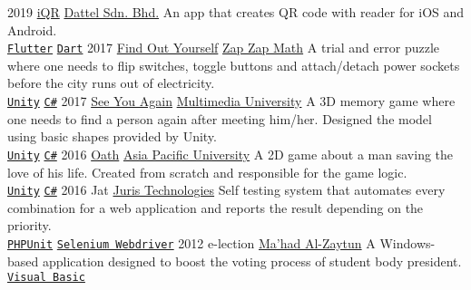 \documentclass[9pt]{developercv} %
\begin{document}

\begin{entrylist}
	\entry
		{2019}
		{\href{https://github.com/azfaralsukor/iQR}{iQR}}
		{\href{https://www.dattel.asia/}{Dattel Sdn. Bhd.}}
		{An app that creates QR code with reader for iOS and Android.\\ 
			\texttt{\href{https://flutter.dev/}{Flutter}}
				\slashsep
			\texttt{\href{https://www.dartlang.org/}{Dart}}
		}
	\entry
		{2017}
		{\href{https://azfaralsukor.github.io/Ludum-Dare-39/}{Find Out Yourself}}
		{\href{https://www.zapzapmath.com/}{Zap Zap Math}}
		{A trial and error puzzle where one needs to flip switches, toggle buttons and attach/detach power sockets before the city runs out of electricity.\\
			\texttt{\href{https://unity3d.com/}{Unity}}
				\slashsep
			\texttt{\href{https://docs.microsoft.com/en-us/dotnet/csharp/}{C\#}}
		}
	\entry
		{2017}
		{\href{https://ldjam.com/events/ludum-dare/38/see-you-again}{See You Again}}
		{\href{https://www.mmu.edu.my/}{Multimedia University}}
		{A 3D memory game where one needs to find a person again after meeting him/her. Designed the model using basic shapes provided by Unity. \\ 
			\texttt{\href{https://unity3d.com/}{Unity}}
				\slashsep
			\texttt{\href{https://docs.microsoft.com/en-us/dotnet/csharp/}{C\#}}
		}
	\entry
		{2016}
		{\href{https://github.com/azfaralsukor/Ludum-Dare-37}{Oath}}
		{\href{http://www.apu.edu.my/}{Asia Pacific University}}
		{A 2D game about a man saving the love of his life. Created from scratch and responsible for the game logic.\\ 
			\texttt{\href{https://unity3d.com/}{Unity}}
				\slashsep
			\texttt{\href{https://docs.microsoft.com/en-us/dotnet/csharp/}{C\#}}
		}
	\entry
		{2016}
		{Jat}
		{\href{http://juristech.net/juristech/}{Juris Technologies}}
		{Self testing system that automates every combination for a web application and reports the result depending on the priority.\\ 
			\texttt{\href{https://phpunit.de/}{PHPUnit}}
				\slashsep
			\texttt{\href{https://www.seleniumhq.org/projects/webdriver/}{Selenium Webdriver}}
		}
	\entry
		{2012}
		{e-lection}
		{\href{http://www.al-zaytun.sch.id/}{Ma'had Al-Zaytun}}
		{A Windows-based application designed to boost the voting process of student body president.\\ 
			\texttt{\href{https://docs.microsoft.com/en-us/dotnet/visual-basic/}{Visual Basic}}
		}
\end{entrylist}
\end{document}
